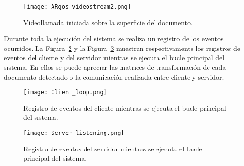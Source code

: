 \begin{figure}
  \begin{center}
    \texttt{[image: ARgos\_videostream2.png]}
    \caption{Videollamada iniciada sobre la superficie del documento.}
    \label{fig:ARgos_videostream2}
  \end{center}
\end{figure}

Durante toda la ejecución del sistema se realiza un registro de los eventos ocurridos. La Figura~\ref{fig:Client_loop} y la Figura~\ref{fig:Server_listening} muestran respectivamente los registros de eventos del cliente y
del servidor mientras se ejecuta el bucle principal del sistema. En ellos se puede apreciar las matrices de transformación de cada documento detectado o la comunicación realizada entre cliente y servidor.

\begin{figure}
  \begin{center}
    \texttt{[image: Client\_loop.png]}
    \caption{Registro de eventos del cliente mientras se ejecuta el bucle principal del sistema.}
    \label{fig:Client_loop}
  \end{center}
\end{figure}

\begin{figure}
  \begin{center}
    \texttt{[image: Server\_listening.png]}
    \caption{Registro de eventos del servidor mientras se ejecuta el bucle principal del sistema.}
    \label{fig:Server_listening}
  \end{center}
\end{figure}
















